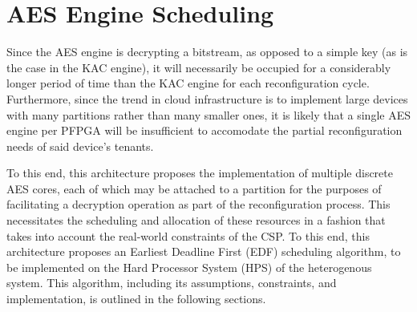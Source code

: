 \chapter{AES Engine Scheduling}\label{chap:EDFAlgorithm}
Since the AES engine is decrypting a bitstream, as opposed to a simple key (as is the case in the KAC engine), it will necessarily be occupied for a considerably longer period of time than the KAC engine for each reconfiguration cycle. Furthermore, since the trend in cloud infrastructure is to implement large devices with many partitions rather than many smaller ones, it is likely that a single AES engine per PFPGA will be insufficient to accomodate the partial reconfiguration needs of said device's tenants.

To this end, this architecture proposes the implementation of multiple discrete AES cores, each of which may be attached to a partition for the purposes of facilitating a decryption operation as part of the reconfiguration process. This necessitates the scheduling and allocation of these resources in a fashion that takes into account the real-world constraints of the CSP. To this end, this architecture proposes an Earliest Deadline First (EDF) scheduling algorithm, to be implemented on the Hard Processor System (HPS) of the heterogenous system. This algorithm, including its assumptions, constraints, and implementation, is outlined in the following sections.

